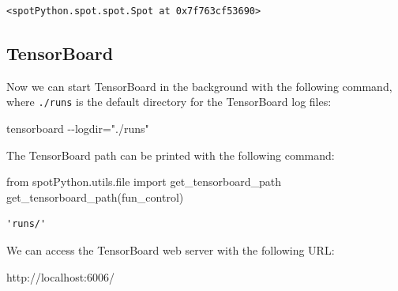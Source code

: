 \documentclass[
  letterpaper,
  DIV=11,
  numbers=noendperiod]{scrreprt}
\newenvironment{Shaded}{\begin{snugshade}}{\end{snugshade}}
\newcommand{\BuiltInTok}[1]{\textcolor[rgb]{0.00,0.23,0.31}{#1}}
\newcommand{\ImportTok}[1]{\textcolor[rgb]{0.00,0.46,0.62}{#1}}
\newcommand{\NormalTok}[1]{\textcolor[rgb]{0.00,0.23,0.31}{#1}}
\begin{document}
\begin{verbatim}
<spotPython.spot.spot.Spot at 0x7f763cf53690>
\end{verbatim}

\subsection{TensorBoard}\label{sec-tensorboard-10}

Now we can start TensorBoard in the background with the following
command, where \texttt{./runs} is the default directory for the
TensorBoard log files:

\begin{Shaded}
\begin{Highlighting}[]
\NormalTok{tensorboard {-}{-}logdir="./runs"}
\end{Highlighting}
\end{Shaded}

\begin{tcolorbox}[enhanced jigsaw, coltitle=black, bottomrule=.15mm, breakable, toprule=.15mm, colframe=quarto-callout-tip-color-frame, title=\textcolor{quarto-callout-tip-color}{\faLightbulb}\hspace{0.5em}{Tip: TENSORBOARD\_PATH}, colbacktitle=quarto-callout-tip-color!10!white, opacityback=0, left=2mm, leftrule=.75mm, colback=white, rightrule=.15mm, bottomtitle=1mm, toptitle=1mm, titlerule=0mm, arc=.35mm, opacitybacktitle=0.6]

The TensorBoard path can be printed with the following command:

\begin{Shaded}
\begin{Highlighting}[]
\ImportTok{from}\NormalTok{ spotPython.utils.}\BuiltInTok{file} \ImportTok{import}\NormalTok{ get\_tensorboard\_path}
\NormalTok{get\_tensorboard\_path(fun\_control)}
\end{Highlighting}
\end{Shaded}

\begin{verbatim}
'runs/'
\end{verbatim}

\end{tcolorbox}

We can access the TensorBoard web server with the following URL:

\begin{Shaded}
\begin{Highlighting}[]
\NormalTok{http://localhost:6006/}
\end{Highlighting}
\end{Shaded}
\end{document}
